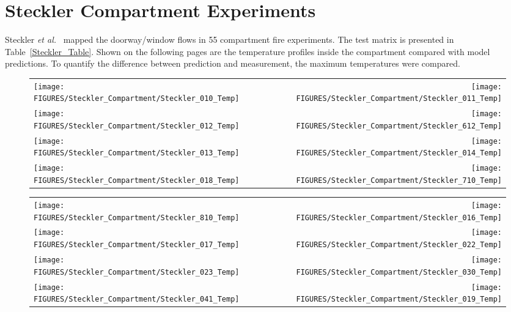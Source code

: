\section{Steckler Compartment Experiments}

Steckler {\em et al.}~\cite{Steckler:1982} mapped the doorway/window flows in 55 compartment fire experiments. The test matrix is presented in Table~\ref{Steckler_Table}. Shown on the following pages are the temperature profiles inside the compartment compared with model predictions. To quantify the difference between prediction and measurement, the maximum temperatures were compared.



\begin{figure}[p]
\begin{tabular*}{\textwidth}{l@{\extracolsep{\fill}}r}
\texttt{[image: FIGURES/Steckler\_Compartment/Steckler\_010\_Temp]} &
\texttt{[image: FIGURES/Steckler\_Compartment/Steckler\_011\_Temp]} \\
\texttt{[image: FIGURES/Steckler\_Compartment/Steckler\_012\_Temp]} &
\texttt{[image: FIGURES/Steckler\_Compartment/Steckler\_612\_Temp]} \\
\texttt{[image: FIGURES/Steckler\_Compartment/Steckler\_013\_Temp]} &
\texttt{[image: FIGURES/Steckler\_Compartment/Steckler\_014\_Temp]} \\
\texttt{[image: FIGURES/Steckler\_Compartment/Steckler\_018\_Temp]} &
\texttt{[image: FIGURES/Steckler\_Compartment/Steckler\_710\_Temp]}
\end{tabular*}
\label{Steckler_Temp_1}
\end{figure}

\begin{figure}[p]
\begin{tabular*}{\textwidth}{l@{\extracolsep{\fill}}r}
\texttt{[image: FIGURES/Steckler\_Compartment/Steckler\_810\_Temp]} &
\texttt{[image: FIGURES/Steckler\_Compartment/Steckler\_016\_Temp]} \\
\texttt{[image: FIGURES/Steckler\_Compartment/Steckler\_017\_Temp]} &
\texttt{[image: FIGURES/Steckler\_Compartment/Steckler\_022\_Temp]} \\
\texttt{[image: FIGURES/Steckler\_Compartment/Steckler\_023\_Temp]} &
\texttt{[image: FIGURES/Steckler\_Compartment/Steckler\_030\_Temp]} \\
\texttt{[image: FIGURES/Steckler\_Compartment/Steckler\_041\_Temp]} &
\texttt{[image: FIGURES/Steckler\_Compartment/Steckler\_019\_Temp]}
\end{tabular*}
\label{Steckler_Temp_2}
\end{figure}

